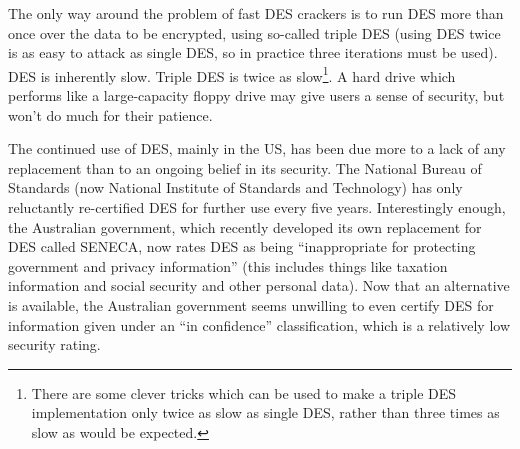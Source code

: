 The only way around the problem of fast DES crackers is to run DES more than
once over the data to be encrypted, using so-called triple DES (using DES twice
is as easy to attack as single DES, so in practice three iterations must be
used).  DES is inherently slow.  Triple DES is twice as slow\footnote{
		There are some clever tricks which can be used to make a triple
              	DES implementation only twice as slow as single DES, rather than
              	three times as slow as would be expected.
}.  A hard
drive which performs like a large-capacity floppy drive may give users a sense
of security, but won't do much for their patience.

The continued use of DES, mainly in the US, has been due more to a lack of any
replacement than to an ongoing belief in its security.  The National Bureau of
Standards (now National Institute of Standards and Technology) has only
reluctantly re-certified DES for further use every five years.  Interestingly
enough, the Australian government, which recently developed its own replacement
for DES called SENECA, now rates DES as being ``inappropriate for protecting
government and privacy information'' (this includes things like taxation
information and social security and other personal data).  Now that an
alternative is available, the Australian government seems unwilling to even
certify DES for information given under an ``in confidence'' classification,
which is a relatively low security rating.

